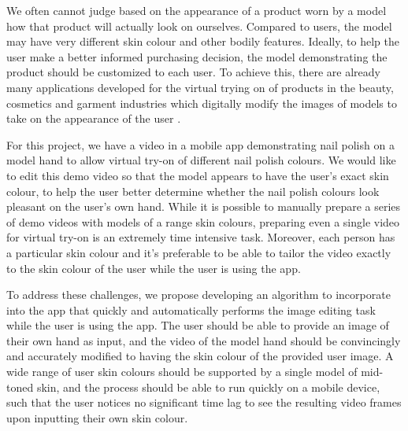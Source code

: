 We often cannot judge based on the appearance of a product worn by a model how that product will actually look on ourselves. Compared to users, the model may have very different skin colour and other bodily features. Ideally, to help the user make a better informed purchasing decision, the model demonstrating the product should be customized to each user. To achieve this, there are already many applications developed for the virtual trying on of products in the beauty, cosmetics and garment industries which digitally modify the images of models to take on the appearance of the user \cite{zhang_2017_try} \cite{shilkrot_2013_garment, li_2015_replace}.

For this project, we have a video in a mobile app demonstrating nail polish on a model hand to allow virtual try-on of different nail polish colours. We would like to edit this demo video so that the model appears to have the user's exact skin colour, to help the user better determine whether the nail polish colours look pleasant on the user's own hand. While it is possible to manually prepare a series of demo videos with models of a range skin colours, preparing even a single video for virtual try-on is an extremely time intensive task. Moreover, each person has a particular skin colour and it's preferable to be able to tailor the video exactly to the skin colour of the user while the user is using the app.

To address these challenges, we propose developing an algorithm to incorporate into the app that quickly and automatically performs the image editing task while the user is using the app. The user should be able to provide an image of their own hand as input, and the video of the model hand should be convincingly and accurately modified to having the skin colour of the provided user image. A wide range of user skin colours should be supported by a single model of mid-toned skin, and the process should be able to run quickly on a mobile device, such that the user notices no significant time lag to see the resulting video frames upon inputting their own skin colour.


